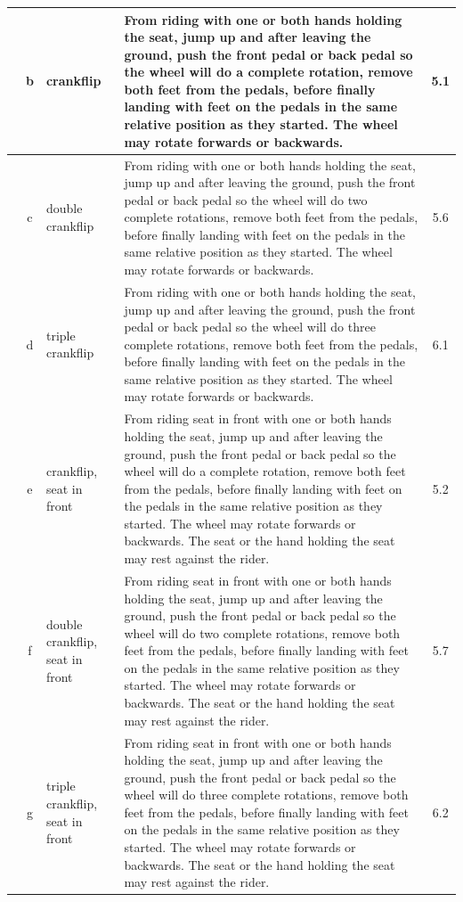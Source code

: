 \begin{longtable}{|r|c|p{4cm}|p{8cm}|c|}
\hline
  & b & crankflip & From riding with one or both hands holding the seat, jump up and after leaving the ground, push the front pedal or back pedal so the wheel will do a complete rotation, remove both feet from the pedals, before finally landing with feet on the pedals in the same relative position as they started. The wheel may rotate forwards or backwards. & 5.1 \\ 
\hline
  & c & double crankflip  & From riding with one or both hands holding the seat, jump up and after leaving the ground, push the front pedal or back pedal so the wheel will do two complete rotations, remove both feet from the pedals, before finally landing with feet on the pedals in the same relative position as they started. The wheel may rotate forwards or backwards.  & 5.6 \\ 
\hline
  & d & triple crankflip  & From riding with one or both hands holding the seat, jump up and after leaving the ground, push the front pedal or back pedal so the wheel will do three complete rotations, remove both feet from the pedals, before finally landing with feet on the pedals in the same relative position as they started. The wheel may rotate forwards or backwards.  & 6.1 \\ 
\hline
  & e & crankflip, seat in front  & From riding seat in front with one or both hands holding the seat, jump up and after leaving the ground, push the front pedal or back pedal so the wheel will do a complete rotation, remove both feet from the pedals, before finally landing with feet on the pedals in the same relative position as they started. The wheel may rotate forwards or backwards. The seat or the hand holding the seat may rest against the rider. & 5.2 \\ 
\hline
  & f & double crankflip, seat in front & From riding seat in front with one or both hands holding the seat, jump up and after leaving the ground, push the front pedal or back pedal so the wheel will do two complete rotations, remove both feet from the pedals, before finally landing with feet on the pedals in the same relative position as they started. The wheel may rotate forwards or backwards. The seat or the hand holding the seat may rest against the rider.  & 5.7 \\ 
\hline
  & g & triple crankflip, seat in front & From riding seat in front with one or both hands holding the seat, jump up and after leaving the ground, push the front pedal or back pedal so the wheel will do three complete rotations, remove both feet from the pedals, before finally landing with feet on the pedals in the same relative position as they started. The wheel may rotate forwards or backwards. The seat or the hand holding the seat may rest against the rider.  & 6.2 \\ 

\end{longtable}
